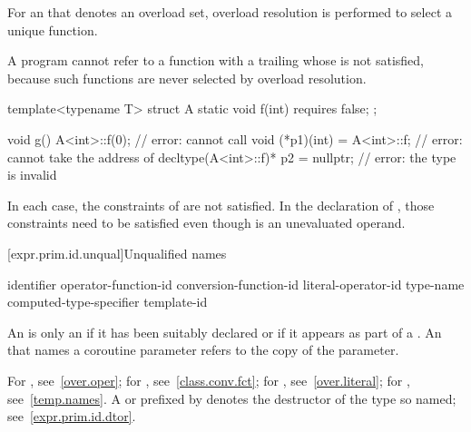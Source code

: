 \pnum
For an  that denotes an overload set,
overload resolution is performed
to select a unique function.
\begin{note}
A program cannot refer to a function
with a trailing 
whose  is not satisfied,
because such functions are never selected by overload resolution.
\begin{example}
\begin{codeblock}
template<typename T> struct A {
  static void f(int) requires false;
};

void g() {
  A<int>::f(0);                         // error: cannot call 
  void (*p1)(int) = A<int>::f;          // error: cannot take the address of 
  decltype(A<int>::f)* p2 = nullptr;    // error: the type  is invalid
}
\end{codeblock}
In each case, the constraints of  are not satisfied.
In the declaration of ,
those constraints need to be satisfied
even though
 is an unevaluated operand.
\end{example}
\end{note}

[expr.prim.id.unqual]{Unqualified names}

\begin{bnf}
\br
    identifier\br
    operator-function-id\br
    conversion-function-id\br
    literal-operator-id\br
    \terminal{\~} type-name\br
    \terminal{\~} computed-type-specifier\br
    template-id
\end{bnf}

\pnum
{}%
An  is only
an  if it has
been suitably declared
or if it appears as part of a .
An  that names a coroutine parameter
refers to the copy of the parameter.
\begin{note}
For , see~\ref{over.oper}; for
, see~\ref{class.conv.fct}; for
, see~\ref{over.literal}; for
, see~\ref{temp.names}.
A  or 
prefixed by \tcode{\~} denotes the destructor of the type so named;
see~\ref{expr.prim.id.dtor}.
\end{note}

